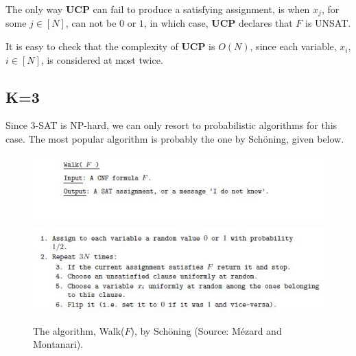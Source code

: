 \documentclass[letterpaper,english,11pt]{article}
\begin{document}
The only way \textbf{UCP} can fail to produce a satisfying assignment, is when $x_j$, for some $j\in [N]$, can not be $0$ or $1$, in which case, \textbf{UCP} declares that $F$ is UNSAT.

It is easy to check that the complexity of \textbf{UCP} is $O(N)$, since each variable, $x_i$, $i\in [N]$, is considered at most twice.

\subsection{K=3}
Since 3-SAT is NP-hard, we can only resort to probabilistic algorithms for this case. The most popular algorithm is probably the one by Sch\"oning, given below.

\begin{figure}[h]
\centering
\includegraphics[scale=1.4]{./Figures/Schoning1.JPG}
\includegraphics[scale=1.3]{./Figures/Schoning2.JPG}
\caption{The algorithm, Walk($F$), by Sch\"oning (Source: M\'ezard and Montanari).}
\end{figure}
\end{document}
